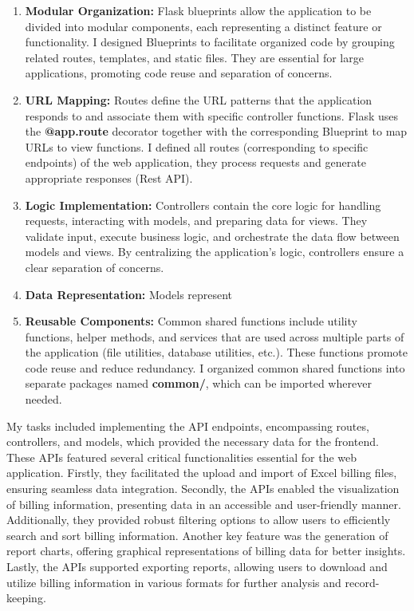    \begin{enumerate}
        \item \textbf{Modular Organization:} Flask blueprints allow the application to be divided into modular components, each representing a distinct feature or functionality. I designed Blueprints to facilitate organized code by grouping related routes, templates, and static files. They are essential for large applications, promoting code reuse and separation of concerns.

        \item \textbf{URL Mapping:} Routes define the URL patterns that the application responds to and associate them with specific controller functions. Flask uses the \textbf{@app.route} decorator together with the corresponding Blueprint to map URLs to view functions. I defined all routes (corresponding to specific endpoints) of the web application, they process requests and generate appropriate responses (Rest API).

        \item \textbf{Logic Implementation:} Controllers contain the core logic for handling requests, interacting with models, and preparing data for views. They validate input, execute business logic, and orchestrate the data flow between models and views. By centralizing the application's logic, controllers ensure a clear separation of concerns.

        \item \textbf{Data Representation:} Models represent 

        \item \textbf{Reusable Components:} Common shared functions include utility functions, helper methods, and services that are used across multiple parts of the application (file utilities, database utilities, etc.). These functions promote code reuse and reduce redundancy. I organized common shared functions into separate packages named \textbf{common/}, which can be imported wherever needed. 
    \end{enumerate}

   My tasks included implementing the API endpoints, encompassing routes, controllers, and models, which provided the necessary data for the frontend. These APIs featured several critical functionalities essential for the web application. Firstly, they facilitated the upload and import of Excel billing files, ensuring seamless data integration. Secondly, the APIs enabled the visualization of billing information, presenting data in an accessible and user-friendly manner. Additionally, they provided robust filtering options to allow users to efficiently search and sort billing information. Another key feature was the generation of report charts, offering graphical representations of billing data for better insights. Lastly, the APIs supported exporting reports, allowing users to download and utilize billing information in various formats for further analysis and record-keeping.

